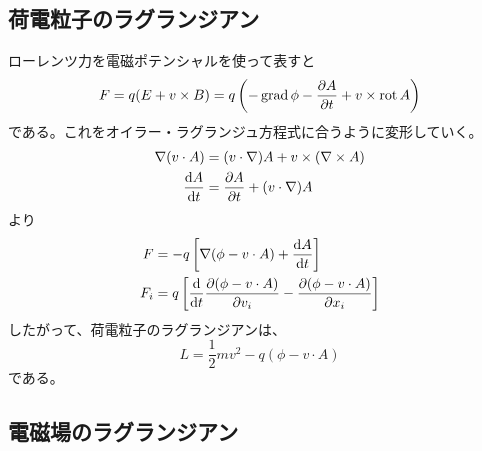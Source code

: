 \subsection{荷電粒子のラグランジアン}
    ローレンツ力を電磁ポテンシャルを使って表すと
        \[F = q(E + v \times B) = q\left(-\operatorname{grad}\phi - \pdv{A}{t} + v \times \operatorname{rot} A\right)\]
    である。これをオイラー・ラグランジュ方程式に合うように変形していく。
    \begin{align*}
        \nabla(v \cdot A) &= (v \cdot \nabla)A + v \times (\nabla \times A)\\
        \dv{A}{t} &= \pdv{A}{t} + (v \cdot \nabla)A
    \end{align*}
    より
    \begin{align*}
        F &= -q \left[\nabla(\phi - v\cdot A) + \dv{A}{t}\right]\\
        F_i &= q\left[\dv{t}\pdv{(\phi - v\cdot A)}{v_i} - \pdv{(\phi - v\cdot A)}{x_i}\right]
    \end{align*}
    したがって、荷電粒子のラグランジアンは、
        \[L = \frac{1}{2}mv^2 - q(\phi - v\cdot A)\]
    である。

\subsection{電磁場のラグランジアン}